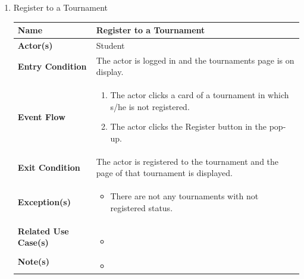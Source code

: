 \begin{enumerate}
\item Register to a Tournament
\begin{center}
    \begin{tabular}{ | m{10em} | m{10cm}| } 
      \hline
      \textbf{Name} & Register to a Tournament  \\ 
      \hline
      \textbf{Actor(s)} & Student \\ 
      \hline
      \textbf{Entry Condition} & The actor is logged in and the tournaments page is on display.\\ 
      \hline
      \textbf{Event Flow} & 
          \begin{enumerate}[(1)]
              \item The actor clicks a card of a tournament in which s/he is not registered.
              \item The actor clicks the Register button in the pop-up.
          \end{enumerate}
      \\ 
      \hline
      \textbf{Exit Condition} & The actor is registered to the tournament and the page of that tournament is displayed.  \\ 
      \hline
      \textbf{Exception(s)} & 
      \begin{itemize}
          \item There are not any tournaments with not registered status.
      \end{itemize}
          \\ 
      \hline
      \textbf{Related Use Case(s)} & 
      \begin{itemize}
          \item 
      \end{itemize}
          \\ 
      \hline
      \textbf{Note(s)} & 
      \begin{itemize}
          \item 
      \end{itemize}
          \\ 
      \hline
    \end{tabular}
\end{center}



\end{enumerate}
